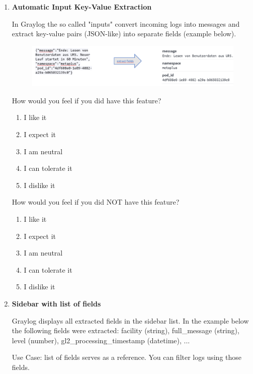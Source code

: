 \documentclass[../main.tex]{subfiles}
\begin{document}
\begin{enumerate}
    \item \textbf{Automatic Input Key-Value Extraction}

    In Graylog the so called "inputs" convert incoming logs into messages and extract key-value pairs (JSON-like) into separate fields (example below).

    \begin{figure}[H]
        \centering
        \includegraphics[scale=0.5]{img/10-appendix/input.png}
        \label{fig:input}
    \end{figure}
    
    How would you feel if you did have this feature?
    
    \begin{enumerate}
        \item I like it
        \item I expect it
        \item  I am neutral
        \item I can tolerate it
        \item I dislike it
    \end{enumerate}

    How would you feel if you did NOT have this feature?
    
    \begin{enumerate}
        \item I like it
        \item I expect it
        \item  I am neutral
        \item I can tolerate it
        \item I dislike it
    \end{enumerate}

    \clearpage
    \item \textbf{Sidebar with list of fields}

    Graylog displays all extracted fields in the sidebar list. In the example below the following fields were extracted: facility (string), full\_message (string),
    level (number), gl2\_processing\_timestamp (datetime), ... 
    
    Use Case: list of fields serves as a reference. You can filter logs using those fields.


\end{enumerate}
\end{document}
